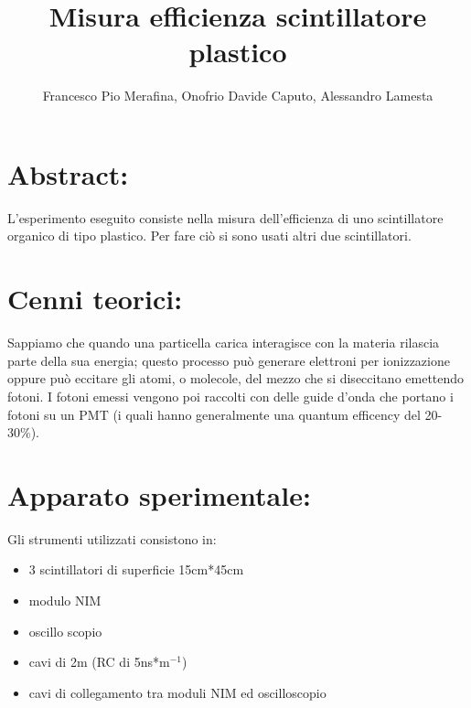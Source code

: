 \documentclass{article}
\title{Misura efficienza scintillatore plastico}
\author{Francesco Pio Merafina, Onofrio Davide Caputo, Alessandro Lamesta}
\date{}
\begin{document}
\maketitle
\section{Abstract:}
L'esperimento eseguito consiste nella misura dell'efficienza di uno scintillatore organico di tipo plastico. Per fare ciò si sono usati altri due scintillatori.
~
\section{Cenni teorici:}
Sappiamo che quando una particella carica interagisce con la materia rilascia parte della sua energia; questo processo può generare elettroni per ionizzazione oppure può eccitare gli atomi, o molecole, del mezzo che si diseccitano emettendo fotoni. I fotoni emessi vengono poi raccolti con delle guide d'onda che portano i fotoni su un PMT (i quali hanno generalmente una quantum efficency del 20-30\%).
~
\section{Apparato sperimentale:}
Gli strumenti utilizzati consistono in:
\begin{itemize}
    \item 3 scintillatori di superficie 15cm*45cm
    \item modulo NIM
    \item oscillo scopio
    \item cavi di 2m (RC di 5ns*m$^{-1}$)
    \item cavi di collegamento tra moduli NIM ed oscilloscopio
\end{itemize}
~
\end{document}
